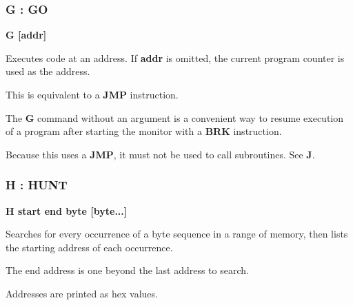 
\subsubsection{G : GO}
\begin{description}[leftmargin=2cm,style=nextline]
\item [Format:] {\bf G [addr]}
\item [Usage:] Executes code at an address. If {\bf addr} is omitted, the current program counter is used as the address.

\item [Remarks:] This is equivalent to a {\bf JMP} instruction.

    The {\bf G} command without an argument is a convenient way to resume execution of a program after starting the monitor with a {\bf BRK} instruction.

    Because this uses a {\bf JMP}, it must not be used to call subroutines. See {\bf J}.

\end{description}


\subsubsection{H : HUNT}
\begin{description}[leftmargin=2cm,style=nextline]
\item [Format:] {\bf H start end byte [byte...]}
\item [Usage:] Searches for every occurrence of a byte sequence in a range of memory, then lists the starting address of each occurrence.

\item [Remarks:] The end address is one beyond the last address to search.

    Addresses are printed as hex values.

\end{description}


